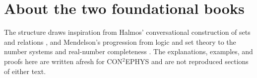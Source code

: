 \section*{About the two foundational books}
The structure draws inspiration from Halmos' conversational construction of sets and relations \cite{HalmosNaive}, and Mendelson's progression from logic and set theory to the number systems and real-number completeness \cite{MendelsonNumbers}. The explanations, examples, and proofs here are written afresh for CON$^2$EPHYS and are not reproduced sections of either text.
